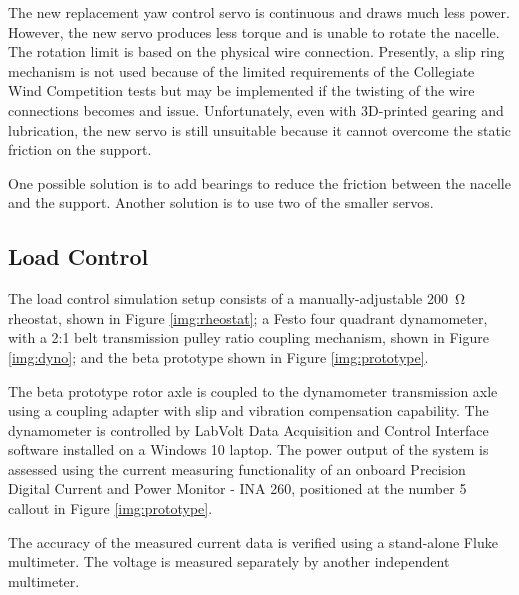 \documentclass[11pt,letterpaper,conference]{IEEEtran}
\begin{document}
The new replacement yaw control servo is continuous and draws much less power.
However, the new servo produces less torque and is unable to rotate the
nacelle. The rotation limit is based on the physical wire connection.
Presently, a slip ring mechanism is not used because of the limited requirements
of the Collegiate Wind Competition tests but may be implemented if the twisting
of the wire connections becomes and issue. Unfortunately, even with 3D-printed
gearing and lubrication, the new servo is still unsuitable because it cannot
overcome the static friction on the support.

One possible solution is to add bearings to reduce the friction between the
nacelle and the support. Another solution is to use two of the smaller servos.


\subsection{Load Control}
\label{sec:load_control}

The load control simulation setup consists of a manually-adjustable
\qty{200}{\ohm} rheostat, shown in Figure \ref{img:rheostat}; a Festo four
quadrant dynamometer, with a 2:1 belt transmission pulley ratio coupling
mechanism, shown in Figure \ref{img:dyno}; and the beta prototype shown in
Figure \ref{img:prototype}.

The beta prototype rotor axle is coupled to the dynamometer transmission
axle using a coupling adapter with slip and vibration compensation
capability. The dynamometer is controlled by LabVolt Data Acquisition and
Control Interface software installed on a Windows 10 laptop. The power output
of the system is assessed using the current measuring functionality of an
onboard Precision Digital Current and Power Monitor - INA 260, positioned
at the number 5 callout in Figure \ref{img:prototype}.

The accuracy of the measured current data is verified using a stand-alone Fluke
multimeter. The voltage is measured separately by another independent
multimeter.
\end{document}
